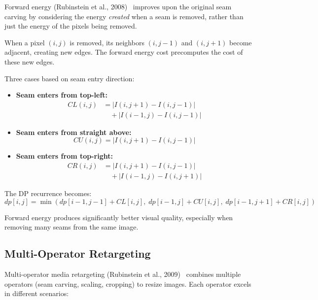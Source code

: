 \documentclass[12pt,a4paper]{article}
\begin{document}
Forward energy (Rubinstein et al., 2008)~\cite{rubinstein2008} improves upon the original seam carving by considering the energy \emph{created} when a seam is removed, rather than just the energy of the pixels being removed.

When a pixel $(i,j)$ is removed, its neighbors $(i,j-1)$ and $(i,j+1)$ become adjacent, creating new edges. The forward energy cost precomputes the cost of these new edges.

Three cases based on seam entry direction:

\begin{itemize}
    \item \textbf{Seam enters from top-left:}
    \begin{align*}
        CL(i,j) &= |I(i,j+1) - I(i,j-1)| \\
               &\quad + |I(i-1,j) - I(i,j-1)|
    \end{align*}
    
    \item \textbf{Seam enters from straight above:}
    \begin{equation}
        CU(i,j) = |I(i,j+1) - I(i,j-1)|
    \end{equation}
    
    \item \textbf{Seam enters from top-right:}
    \begin{align*}
        CR(i,j) &= |I(i,j+1) - I(i,j-1)| \\
               &\quad + |I(i-1,j) - I(i,j+1)|
    \end{align*}
\end{itemize}

The DP recurrence becomes:
\begin{equation}
    dp[i,j] = \min(dp[i-1,j-1] + CL[i,j],\; dp[i-1,j] + CU[i,j],\; dp[i-1,j+1] + CR[i,j])
\end{equation}

Forward energy produces significantly better visual quality, especially when removing many seams from the same image.

\subsection{Multi-Operator Retargeting}

Multi-operator media retargeting (Rubinstein et al., 2009)~\cite{rubinstein2009} combines multiple operators (seam carving, scaling, cropping) to resize images. Each operator excels in different scenarios:
\end{document}

